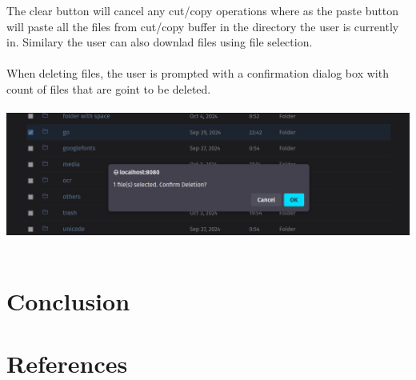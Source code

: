 \documentclass[12pt]{article}
\begin{document}
The clear button will cancel any cut/copy operations where as the paste button will paste all the files from cut/copy buffer in the directory the user is currently in. Similary the user can also downlad files using file selection. \\ \\

When deleting files, the user is prompted with a confirmation dialog box with count of files that are goint to be deleted. \\ \\
\includegraphics[width=\linewidth]{ss/8.cm-delete-prompt.png} \\ \\


\section{Conclusion}


\section{References}


\fi  %
\end{document}
